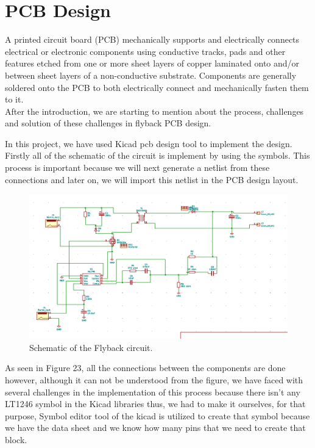\documentclass{article}
\begin{document}
\section{PCB Design}
    A printed circuit board (PCB) mechanically supports and electrically connects electrical or electronic components using conductive tracks, pads and other features etched from one or more sheet layers of copper laminated onto and/or between sheet layers of a non-conductive substrate. Components are generally soldered onto the PCB to both electrically connect and mechanically fasten them to it.\\

	After the introduction, we are starting to mention about the process, challenges and solution of these challenges in flyback PCB design. 
	
	In this project, we have used Kicad pcb design tool to implement the design. Firstly all of the schematic of the circuit is implement by using the symbols. This process is important because we will next generate a netlist from these connections and later on, we will import this netlist in the PCB design layout. 

\begin{figure}[H]
    \centering
    \includegraphics[scale=0.8]{PCB1.png}
    \caption{Schematic of the Flyback circuit.}
    \label{fig:my_label}
\end{figure}

As seen in Figure 23, all the connections between the components are done however, although it can not be understood from the figure, we have faced with several challenges in the implementation of this process because there isn’t any LT1246 symbol in the Kicad libraries thus, we had to make it ourselves, for that purpose, Symbol editor tool of the kicad is utilized to create that symbol because we have the data sheet and we know how many pins that we need to create that block.
\end{document}
